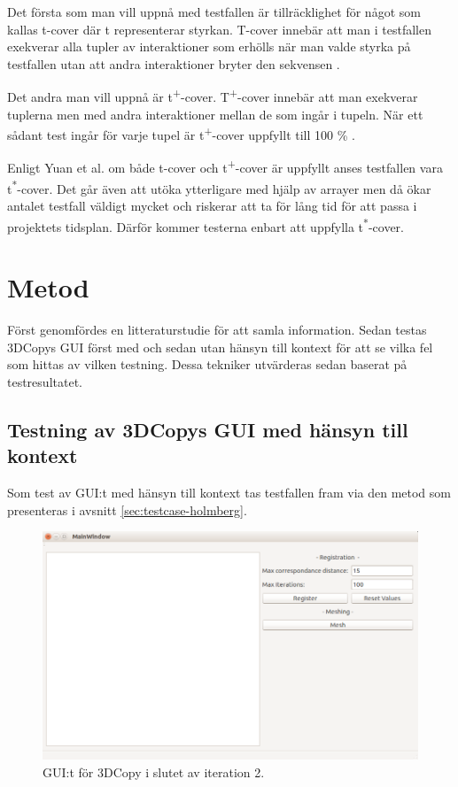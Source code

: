 Det första som man vill uppnå med testfallen är tillräcklighet för något som kallas t-cover där t representerar styrkan. T-cover innebär att man i testfallen exekverar alla tupler av interaktioner som erhölls när man valde styrka på testfallen utan att andra interaktioner bryter den sekvensen \cite{yuan2011gui}.

Det andra man vill uppnå är t\textsuperscript{+}-cover. T\textsuperscript{+}-cover innebär att man exekverar tuplerna men med andra interaktioner mellan de som ingår i tupeln. När ett sådant test ingår för varje tupel är t\textsuperscript{+}-cover uppfyllt till 100 \% \cite{yuan2011gui}.

Enligt Yuan et al. \cite{yuan2011gui} om både t-cover och t\textsuperscript{+}-cover är uppfyllt anses testfallen vara t\textsuperscript{*}-cover. Det går även att utöka ytterligare med hjälp av arrayer men då ökar antalet testfall väldigt mycket och riskerar att ta för lång tid för att passa i projektets tidsplan. Därför kommer testerna enbart att uppfylla t\textsuperscript{*}-cover.

\section{Metod}
\label{sec:method-holmberg}

Först genomfördes en litteraturstudie för att samla information. Sedan testas 3DCopys GUI först med och sedan utan hänsyn till kontext för att se vilka fel som hittas av vilken testning. Dessa tekniker utvärderas sedan baserat på testresultatet.

\subsection{Testning av 3DCopys GUI med hänsyn till kontext}

Som test av GUI:t med hänsyn till kontext tas testfallen fram via den metod som presenteras i avsnitt \ref{sec:testcase-holmberg}.

\begin{figure}[H]
	\centering
	\includegraphics[width=130mm]{figures/3DCopyGUI.PNG}
	\caption{GUI:t för 3DCopy i slutet av iteration 2.}
	\label{fig:3dcopy_gui}
\end{figure}


